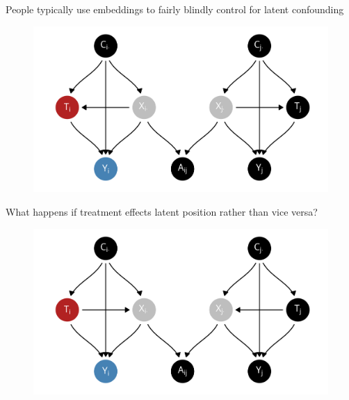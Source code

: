 \documentclass[aspectratio=169]{beamer}
\theoremstyle{remark}
\begin{document}
\begin{frame}{People typically use embeddings to fairly blindly control for latent confounding}
    \begin{figure}
        \centering
        \includegraphics[width=\textwidth]{./figures/dags/confounding-homophily.png}
    \end{figure}
\end{frame}

\begin{frame}{What happens if treatment effects latent position rather than vice versa?}
    \begin{figure}
        \centering
        \includegraphics[width=\textwidth]{./figures/dags/homophily-mediating.png}
    \end{figure}
\end{frame}
\end{document}
